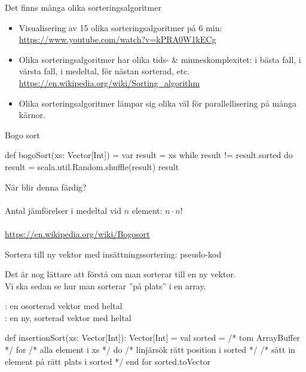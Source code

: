 \begin{Slide}{Det finns många olika sorteringsalgoritmer}
\begin{itemize}
\item Visualisering av 15 olika sorteringsalgoritmer på 6 min:\\{\SlideFontSmall\url{https://www.youtube.com/watch?v=kPRA0W1kECg}}
\item Olika sorteringsalgoritmer har olika tids- \& minneskomplexitet: i bästa fall, i värsta fall, i medeltal, för nästan sorterad, etc.
\\{\SlideFontSmall\url{https://en.wikipedia.org/wiki/Sorting_algorithm}}
\item Olika sorteringsalgoritmer lämpar sig olika väl för parallellisering på många kärnor.
\end{itemize}
\end{Slide}

\begin{Slide}{Bogo sort}
\begin{Code}
def bogoSort(xs: Vector[Int]) = 
  var result = xs
  while result != result.sorted do
    result = scala.util.Random.shuffle(result)
  result
\end{Code}
När blir denna färdig? \pause \\~\\
Antal jämförelser i medeltal vid $n$ element: $ n \cdot n!$ \\~\\
\url{https://en.wikipedia.org/wiki/Bogosort}

\end{Slide}


\begin{Slide}{Sortera till ny vektor med insättningssortering: pseudo-kod}

{\SlideFontSmall Det är nog lättare att förstå  om man sorterar till en ny vektor. \\ Vi ska sedan se hur man sorterar ''på plats''  i en  array.\\} \vspace{0.5em}

\noindent {}: en osorterad vektor med heltal \\
: en ny, sorterad vektor med heltal
\begin{Code}
def insertionSort(xs: Vector[Int]): Vector[Int] = 
  val sorted = /* tom ArrayBuffer */
  for /* alla element i xs */ do
     /* linjärsök rätt position i sorted */
     /* sätt in element på rätt plats i sorted */
  end for
  sorted.toVector
\end{Code}
\end{Slide}


